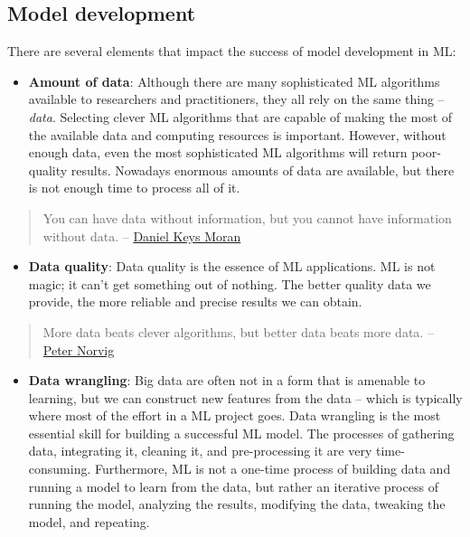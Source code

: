 \documentclass[
]{book}
\providecommand{\tightlist}{%
  \setlength{\itemsep}{0pt}\setlength{\parskip}{0pt}}
\begin{document}
\hypertarget{model-development}{%
\subsection{Model development}\label{model-development}}

There are several elements that impact the success of model development in ML:

\begin{itemize}
\tightlist
\item
  \textbf{Amount of data}: Although there are many sophisticated ML algorithms available to researchers and practitioners, they all rely on the same thing -- \emph{data}. Selecting clever ML algorithms that are capable of making the most of the available data and computing resources is important. However, without enough data, even the most sophisticated ML algorithms will return poor-quality results. Nowadays enormous amounts of data are available, but there is not enough time to process all of it.
\end{itemize}

\begin{quote}
You can have data without information, but you cannot have information without data. -- \href{https://en.wikipedia.org/wiki/Daniel_Keys_Moran}{Daniel Keys Moran}
\end{quote}

\begin{itemize}
\tightlist
\item
  \textbf{Data quality}: Data quality is the essence of ML applications. ML is not magic; it can't get something out of nothing. The better quality data we provide, the more reliable and precise results we can obtain.
\end{itemize}

\begin{quote}
More data beats clever algorithms, but better data beats more data. -- \href{https://en.wikipedia.org/wiki/Peter_Norvig}{Peter Norvig}
\end{quote}

\begin{itemize}
\tightlist
\item
  \textbf{Data wrangling}: Big data are often not in a form that is amenable to learning, but we can construct new features from the data -- which is typically where most of the effort in a ML project goes. Data wrangling is the most essential skill for building a successful ML model. The processes of gathering data, integrating it, cleaning it, and pre-processing it are very time-consuming. Furthermore, ML is not a one-time process of building data and running a model to learn from the data, but rather an iterative process of running the model, analyzing the results, modifying the data, tweaking the model, and repeating.
\end{itemize}
\end{document}
